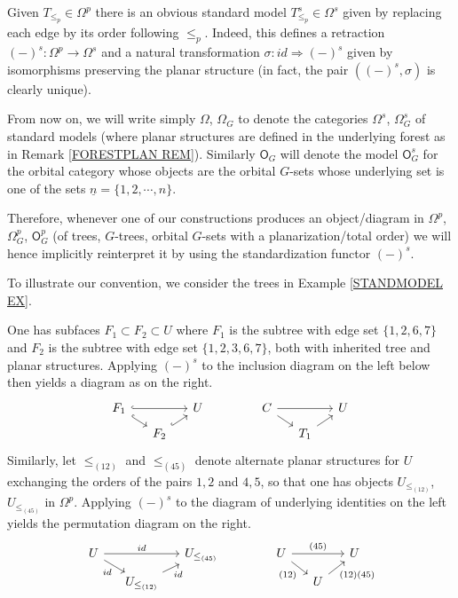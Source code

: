 \documentclass[a4paper,10pt]{article}%
\begin{document}
Given $T_{\leq_p} \in \Omega^p$ there is an obvious standard model $T_{\leq_p}^s \in \Omega^s$ given by replacing each edge by its order following $\leq_p$. Indeed, this defines a retraction 
$(\minus)^s \colon \Omega^p \to \Omega^s$
and a natural transformation 
$\sigma \colon id \Rightarrow (\minus)^s$
given by isomorphisms preserving the planar structure
(in fact, the pair $\left((\minus)^s, \sigma \right)$ is clearly unique).


\begin{convention}\label{PLANARCONV CON}
	From now on, we will write simply $\Omega$, $\Omega_G$ to denote the categories $\Omega^s$, $\Omega_G^s$ of standard models (where planar structures are defined in the underlying forest as in Remark \ref{FORESTPLAN REM}). 
Similarly $\mathsf{O}_G$ will denote the model $\mathsf{O}_G^s$ for the orbital category whose objects are the orbital $G$-sets whose underlying set is one of the sets $\underline{n} = \{1,2,\cdots,n\}$.

Therefore, whenever one of our constructions produces an object/diagram in $\Omega^p$, $\Omega^p_G$, $\mathsf{O}_G^p$ (of trees, $G$-trees, orbital $G$-sets with a planarization/total order) we will hence implicitly reinterpret it by using the standardization functor $(\minus)^s$.
\end{convention}

\begin{example}
To illustrate our convention, we consider the trees in Example \ref{STANDMODEL EX}. 

One has subfaces
$F_1 \subset F_2 \subset U$
where $F_1$ is the subtree with edge set $\{1,2,6,7\}$ and 
$F_2$ is the subtree with edge set $\{1,2,3,6,7\}$, both with inherited tree and planar structures. 
Applying $(\minus)^s$ to the inclusion diagram on the left below then yields a diagram as on the right.
\[
\begin{tikzcd}[row sep = 0.5em,column sep =1.3em]
	F_1 \ar[hookrightarrow]{rr} \ar[hookrightarrow]{rd} & & U & &&
	C \ar{rr} \ar{rd} & & U
\\
	& F_2 \ar[hookrightarrow]{ru} & & &&
	& T_1 \ar{ru}
\end{tikzcd}
\]
Similarly, let $\leq_{(12)}$ and $\leq_{(45)}$ denote alternate planar structures for $U$ exchanging the orders of the pairs $1,2$ and $4,5$, so that one has objects 
$U_{\leq_{(12)}}$, $U_{\leq_{(45)}}$ in $\Omega^p$. 
Applying $(\minus)^s$ to the diagram of underlying identities on the left yields the permutation diagram on the right.
\[
\begin{tikzcd}[row sep = 0.5em,column sep =1.3em]
	U \ar{rr}{id} \ar{rd}[swap]{id} & & U_{\leq_{(45)}} & & &
	U \ar{rr}{(45)} \ar{rd}[swap]{(12)} & & U
\\
	& U_{\leq_{(12)}} \ar{ru}[swap]{id} & & & &
	& U \ar{ru}[swap]{(12)(45)}
\end{tikzcd}
\]
\end{example}
\end{document}
